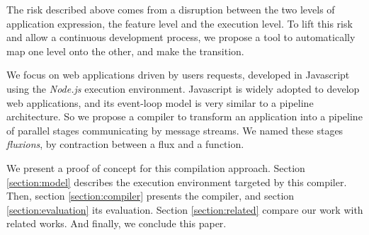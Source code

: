 The risk described above comes from a disruption between the two levels of application expression, the feature level and the execution level.
To lift this risk and allow a continuous development process, we propose a tool to automatically map one level onto the other, and make the transition.

We focus on web applications driven by users requests, developed in Javascript using the \textit{Node.js} execution environment.
Javascript is widely adopted to develop web applications, and its event-loop model is very similar to a pipeline architecture.
So we propose a compiler to transform an application into a pipeline of parallel stages communicating by message streams.
We named these stages \textit{fluxions}, by contraction between a flux and a function.

We present a proof of concept for this compilation approach.
Section \ref{section:model} describes the execution environment targeted by this compiler.
Then, section \ref{section:compiler} presents the compiler, and section \ref{section:evaluation} its evaluation.
Section \ref{section:related} compare our work with related works.
And finally, we conclude this paper.